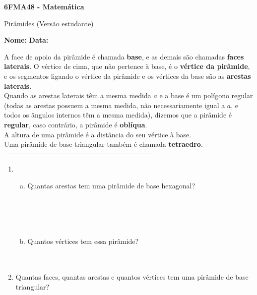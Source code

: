 \documentclass[a4paper,14pt]{article}
\begin{document}
	
	\noindent\textbf{6FMA48 - Matemática} 
	
	\begin{center}Pirâmides (Versão estudante)
	\end{center}
	
	\noindent\textbf{Nome:} \underline{\hspace{10cm}}
	\noindent\textbf{Data:} \underline{\hspace{4cm}}
	
	
	
    \begin{multicols}{2}
    	\noindent A face de apoio da pirâmide é chamada \textbf{base}, e as demais são chamadas \textbf{faces laterais}. O vértice de cima, que não pertence à base, é o \textbf{vértice da pirâmide}, e os segmentos ligando o vértice da pirâmide e os vértices da base são as \textbf{arestas laterais}. \\
    	Quando as arestas laterais têm a mesma medida $a$ e a base é um polígono regular (todas as arestas possuem a mesma medida, não necessariamente igual a $a$, e todos os ângulos internos têm a mesma medida), dizemos que a pirâmide é \textbf{regular}, caso contrário, a pirâmide é \textbf{oblíqua}. \\
    	A altura de uma pirâmide é a distância do seu vértice à base. \\
    	Uma pirâmide de base triangular também é chamada \textbf{tetraedro}.
    	\noindent\textsubscript{~---------------------------------------------------------------------------}
		\begin{enumerate}
			\item \begin{enumerate}[a)]
				\item Quantas arestas tem uma pirâmide de base hexagonal? \\\\\\\\\\
				\item Quantos vértices tem essa pirâmide? \\\\\\			\end{enumerate}
		    \item Quantas faces, quantas arestas e quantos vértices tem uma pirâmide de base triangular? \\\\\\\\\\\\\\

\end{enumerate}
\end{multicols}
\end{document}
